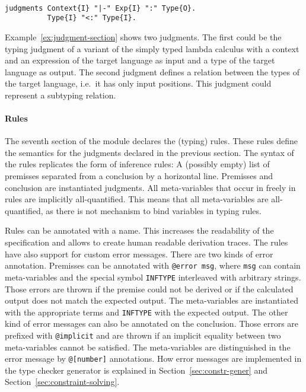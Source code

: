 \begin{example}{~}
\begin{lstlisting}[language=sltc]
judgments Context{I} "|-" Exp{I} ":" Type{O}.
          Type{I} "<:" Type{I}.
\end{lstlisting}
\label{ex:judgment-section}
\end{example}

Example~\ref{ex:judgment-section} shows two judgments. The first could
be the typing judgment of a variant of the simply typed lambda
calculus with a context and an expression of the target language as
input and a type of the target language as output. The second judgment
defines a relation between the types of the target language, i.e.\ it
has only input positions. This judgment could represent a subtyping
relation.

\paragraph{Rules} The seventh section of the module declares the
(typing) rules. These rules define the semantics for the judgments
declared in the previous section. The syntax of the rules replicates
the form of inference rules: A (possibly empty) list of premisses
separated from a conclusion by a horizontal line. Premisses and
conclusion are instantiated judgments. All meta-variables that occur
in freely in rules are implicitly all-quantified. This means that all
meta-variables are all-quantified, as there is not mechanism to bind
variables in typing rules.

Rules can be annotated with a name. This increases the readability of
the specification and allows to create human readable derivation
traces. The rules have also support for custom error messages. There
are two kinds of error annotation. Premisses can be annotated with
\verb|@error msg|, where \verb|msg| can contain meta-variables and the
special symbol \verb|INFTYPE| interleaved with arbitrary
strings. Those errors are thrown if the premise could not be derived
or if the calculated output does not match the expected output. The
meta-variables are instantiated with the appropriate terms and
\verb|INFTYPE| with the expected output. The other kind of error
messages can also be annotated on the conclusion. Those errors are
prefixed with \verb|@implicit| and are thrown if an implicit equality
between two meta-variables cannot be satisfied. The meta-variables are
distinguished in the error message by \verb|@[number]|
annotations. How error messages are implemented in the type checker
generator is explained in Section~\ref{sec:constr-gener} and
Section~\ref{sec:constraint-solving}.

